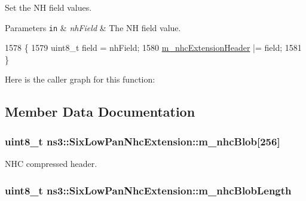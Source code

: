 Set the NH field values. 


\begin{DoxyParams}[1]{Parameters}
\mbox{\tt in}  & {\em nh\+Field} & The NH field value. \\
\hline
\end{DoxyParams}

\begin{DoxyCode}
1578 \{
1579   uint8\_t field = nhField;
1580   \hyperlink{classns3_1_1SixLowPanNhcExtension_a4fe43caeba3a84f5c51ebe9d0948f947}{m\_nhcExtensionHeader} |= field;
1581 \}
\end{DoxyCode}


Here is the caller graph for this function\+:




\subsection{Member Data Documentation}
\subsubsection[{\texorpdfstring{m\+\_\+nhc\+Blob}{m_nhcBlob}}]{\setlength{\rightskip}{0pt plus 5cm}uint8\+\_\+t ns3\+::\+Six\+Low\+Pan\+Nhc\+Extension\+::m\+\_\+nhc\+Blob\mbox{[}256\mbox{]}\hspace{0.3cm}{\ttfamily [private]}}\hypertarget{classns3_1_1SixLowPanNhcExtension_a0d528c84835373081b2412458b6a4f78}{}\label{classns3_1_1SixLowPanNhcExtension_a0d528c84835373081b2412458b6a4f78}


N\+HC compressed header. 

\subsubsection[{\texorpdfstring{m\+\_\+nhc\+Blob\+Length}{m_nhcBlobLength}}]{\setlength{\rightskip}{0pt plus 5cm}uint8\+\_\+t ns3\+::\+Six\+Low\+Pan\+Nhc\+Extension\+::m\+\_\+nhc\+Blob\+Length\hspace{0.3cm}{\ttfamily [private]}}\hypertarget{classns3_1_1SixLowPanNhcExtension_ab0a959a135df36e5ad069f0371d84337}{}\label{classns3_1_1SixLowPanNhcExtension_ab0a959a135df36e5ad069f0371d84337}


